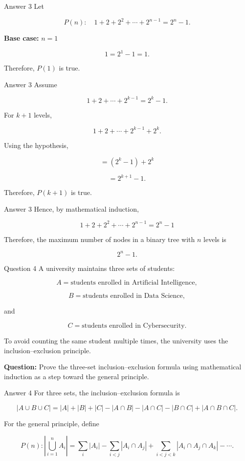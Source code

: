 \begin{frame}{Answer 3}
Let

$$
P(n):\quad
1+2+2^2+\cdots+2^{n-1}=2^n-1.
$$

\textbf{Base case:} $n=1$

$$
1=2^1-1=1.
$$

Therefore, $P(1)$ is true.
\end{frame}

\begin{frame}{Answer 3}
Assume

$$
1+2+\cdots+2^{k-1}=2^k-1.
$$

For $k+1$ levels,

$$
1+2+\cdots+2^{k-1}+2^k.
$$

Using the hypothesis,

$$
=(2^k-1)+2^k
$$

$$
=2^{k+1}-1.
$$

Therefore, $P(k+1)$ is true.
\end{frame}

\begin{frame}{Answer 3}
Hence, by mathematical induction,

$$
\boxed{
1+2+2^2+\cdots+2^{n-1}=2^n-1
}
$$

Therefore, the maximum number of nodes in a binary tree with $n$ levels is

$$
\boxed{2^n-1}.
$$

\end{frame}


\begin{frame}{Question 4}
A university maintains three sets of students:

$$
A=\text{students enrolled in Artificial Intelligence},
$$

$$
B=\text{students enrolled in Data Science},
$$

and

$$
C=\text{students enrolled in Cybersecurity}.
$$

To avoid counting the same student multiple times, the university uses the
inclusion--exclusion principle.

\textbf{Question:} Prove the three-set inclusion--exclusion formula using
mathematical induction as a step toward the general principle.
\end{frame}

\begin{frame}{Answer 4}
For three sets, the inclusion--exclusion formula is

$$
|A\cup B\cup C|
=
|A|+|B|+|C|
-|A\cap B|-|A\cap C|-|B\cap C|
+|A\cap B\cap C|.
$$

For the general principle, define

$$
P(n):
\left|
\bigcup_{i=1}^{n}A_i
\right|
=
\sum_i|A_i|
-\sum_{i<j}|A_i\cap A_j|
+\sum_{i<j<k}|A_i\cap A_j\cap A_k|
-\cdots.
$$

\end{frame}

